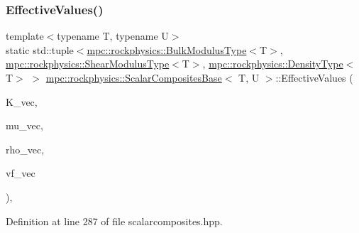 \subsubsection{\texorpdfstring{Effective\+Values()}{EffectiveValues()}}
{\footnotesize\ttfamily template$<$typename T, typename U$>$ \\
static std\+::tuple$<$\mbox{\hyperlink{structmpc_1_1rockphysics_1_1_bulk_modulus_type}{mpc\+::rockphysics\+::\+Bulk\+Modulus\+Type}}$<$T$>$, \mbox{\hyperlink{structmpc_1_1rockphysics_1_1_shear_modulus_type}{mpc\+::rockphysics\+::\+Shear\+Modulus\+Type}}$<$T$>$, \mbox{\hyperlink{structmpc_1_1rockphysics_1_1_density_type}{mpc\+::rockphysics\+::\+Density\+Type}}$<$T$>$ $>$ \mbox{\hyperlink{classmpc_1_1rockphysics_1_1_scalar_composites_base}{mpc\+::rockphysics\+::\+Scalar\+Composites\+Base}}$<$ T, U $>$\+::Effective\+Values (\begin{DoxyParamCaption}\item[{const std\+::vector$<$ \mbox{\hyperlink{structmpc_1_1rockphysics_1_1_bulk_modulus_type}{mpc\+::rockphysics\+::\+Bulk\+Modulus\+Type}}$<$ T $>$ $>$ \&}]{K\+\_\+vec,  }\item[{const std\+::vector$<$ \mbox{\hyperlink{structmpc_1_1rockphysics_1_1_shear_modulus_type}{mpc\+::rockphysics\+::\+Shear\+Modulus\+Type}}$<$ T $>$ $>$ \&}]{mu\+\_\+vec,  }\item[{const std\+::vector$<$ \mbox{\hyperlink{structmpc_1_1rockphysics_1_1_density_type}{mpc\+::rockphysics\+::\+Density\+Type}}$<$ T $>$ $>$ \&}]{rho\+\_\+vec,  }\item[{const std\+::vector$<$ \mbox{\hyperlink{structmpc_1_1rockphysics_1_1_volume_fraction_type}{mpc\+::rockphysics\+::\+Volume\+Fraction\+Type}}$<$ T $>$ $>$ \&}]{vf\+\_\+vec }\end{DoxyParamCaption})\hspace{0.3cm}{\ttfamily [inline]}, {\ttfamily [static]}}



Definition at line 287 of file scalarcomposites.\+hpp.

\mbox{\label{classmpc_1_1rockphysics_1_1_scalar_composites_base_a4087bdf26403c7b739e2807524bc5596}} 
